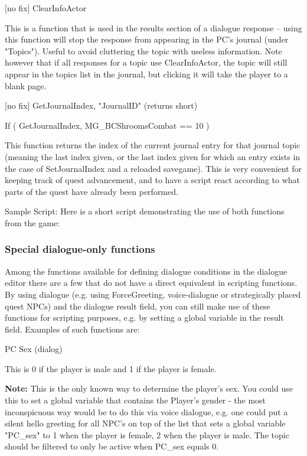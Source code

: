 {[}no fix{]} ClearInfoActor

This is a function that is used in the results section of a dialogue
response -- using this function will stop the response from appearing in
the PC's journal (under "Topics"). Useful to avoid cluttering the topic
with useless information. Note however that if all responses for a topic
use ClearInfoActor, the topic will still appear in the topics list in
the journal, but clicking it will take the player to a blank page.

{[}no fix{]} GetJournalIndex, "JournalID" (returns short)

If ( GetJournalIndex, MG\_BCShroomsCombat == 10 )

This function returns the index of the current journal entry for that
journal topic (meaning the last index given, or the last index given for
which an entry exists in the case of SetJournalIndex and a reloaded
savegame). This is very convenient for keeping track of quest
advancement, and to have a script react according to what parts of the
quest have already been performed.

Sample Script: Here is a short script demonstrating the use of both
functions from the game:



\hypertarget{special-dialogue-only-functions}{%
\subsubsection{Special dialogue-only
functions}\label{special-dialogue-only-functions}}

Among the functions available for defining dialogue conditions in the
dialogue editor there are a few that do not have a direct equivalent in
scripting functions. By using dialogue (e.g. using ForceGreeting,
voice-dialogue or strategically placed quest NPCs) and the dialogue
result field, you can still make use of these functions for scripting
purposes, e.g. by setting a global variable in the result field.
Examples of such functions are:

PC Sex (dialog)

This is 0 if the player is male and 1 if the player is female.

\textbf{Note:} This is the only known way to determine the player's sex.
You could use this to set a global variable that contains the Player's
gender - the most inconspicuous way would be to do this via voice
dialogue, e.g. one could put a silent hello greeting for all NPC's on
top of the list that sets a global variable "PC\_sex" to 1 when the
player is female, 2 when the player is male. The topic should be
filtered to only be active when PC\_sex equals 0.


